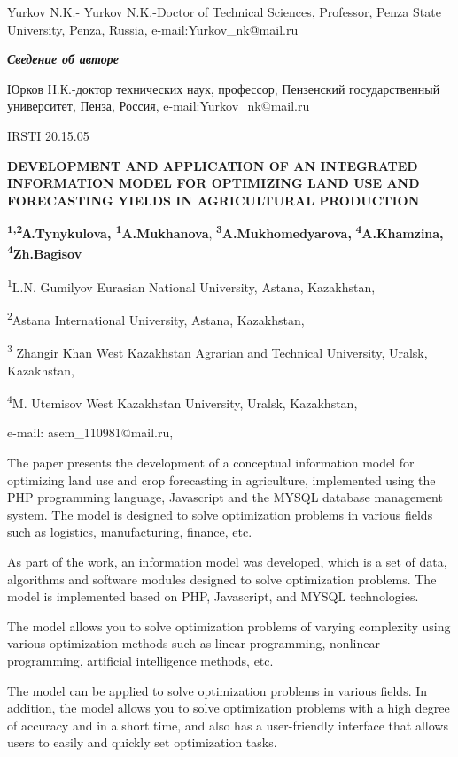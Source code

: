 Yurkov N.K.- Yurkov N.K.-Doctor of Technical Sciences, Professor, Penza
State University, Penza, Russia, e-mail:Yurkov\_nk@mail.ru

\emph{\textbf{Сведение об авторе}}

Юрков Н.К.-доктор технических наук, профессор, Пензенский
государственный университет, Пенза, Россия, e-mail:Yurkov\_nk@mail.ru

IRSTI 20.15.05

\textbf{DEVELOPMENT AND APPLICATION OF AN INTEGRATED INFORMATION MODEL
FOR OPTIMIZING LAND USE AND FORECASTING YIELDS IN AGRICULTURAL
PRODUCTION}

\textbf{\textsuperscript{1,2}А.Tynykulova,
\textsuperscript{1}A.Mukhanova},
\textbf{\textsuperscript{3}A.Mukhomedyarova,}
\textbf{\textsuperscript{4}A.Khamzina, \textsuperscript{4}Zh.Bagisov}

\textsuperscript{1}L.N. Gumilyov Eurasian National University, Astana,
Kazakhstan,

\textsuperscript{2}Astana International University, Astana, Kazakhstan,

\textsuperscript{3} Zhangir Khan West Kazakhstan Agrarian and Technical
University, Uralsk, Kazakhstan,

\textsuperscript{4}M. Utemisov West Kazakhstan University, Uralsk,
Kazakhstan,

e-mail: asem\_110981@mail.ru,

The paper presents the development of a conceptual information model for
optimizing land use and crop forecasting in agriculture, implemented
using the PHP programming language, Javascript and the MYSQL database
management system. The model is designed to solve optimization problems
in various fields such as logistics, manufacturing, finance, etc.

As part of the work, an information model was developed, which is a set
of data, algorithms and software modules designed to solve optimization
problems. The model is implemented based on PHP, Javascript, and MYSQL
technologies.

The model allows you to solve optimization problems of varying
complexity using various optimization methods such as linear
programming, nonlinear programming, artificial intelligence methods,
etc.

The model can be applied to solve optimization problems in various
fields. In addition, the model allows you to solve optimization problems
with a high degree of accuracy and in a short time, and also has a
user-friendly interface that allows users to easily and quickly set
optimization tasks.

